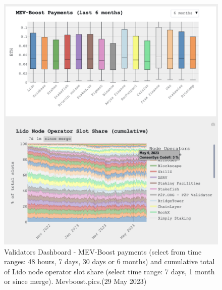 \documentclass[UTF8]{article}
\begin{document}
{\begin{figure}[htbp]
\begin{center}
\includegraphics[width=0.9\linewidth]{images/mevvalidator3}
\caption{Validators Dashboard - MEV-Boost payments (select from time ranges: 48 hours, 7 days, 30 days or 6 months) and cumulative total of Lido node operator slot share (select time range: 7 days, 1 month or since merge). Mevboost.pics.(29 May 2023)}
\label{fig:mevvalidator3}
\end{center}
\end{figure}

}
\end{document}
